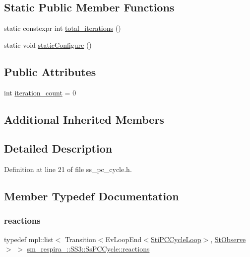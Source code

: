 \subsection*{Static Public Member Functions}
\begin{DoxyCompactItemize}
\item 
static constexpr int \hyperlink{structsm__respira__1_1_1SS3_1_1SsPCCycle_a9d53ab702ea684b8856696cca20f1115}{total\+\_\+iterations} ()
\item 
static void \hyperlink{structsm__respira__1_1_1SS3_1_1SsPCCycle_a94b00884a6ca90ba16b8207ece448ea4}{static\+Configure} ()
\end{DoxyCompactItemize}
\subsection*{Public Attributes}
\begin{DoxyCompactItemize}
\item 
int \hyperlink{structsm__respira__1_1_1SS3_1_1SsPCCycle_ad4242946ceb38c89f6e4c916139a2e93}{iteration\+\_\+count} = 0
\end{DoxyCompactItemize}
\subsection*{Additional Inherited Members}


\subsection{Detailed Description}


Definition at line 21 of file ss\+\_\+pc\+\_\+cycle.\+h.



\subsection{Member Typedef Documentation}
\mbox{\label{structsm__respira__1_1_1SS3_1_1SsPCCycle_a04b24f141aa6ad55e40be05fe81d9c8b}} 
\subsubsection{\texorpdfstring{reactions}{reactions}}
{\footnotesize\ttfamily typedef mpl\+::list$<$ Transition$<$Ev\+Loop\+End$<$\hyperlink{structsm__respira__1_1_1pc__cycle__inner__states_1_1StiPCCycleLoop}{Sti\+P\+C\+Cycle\+Loop}$>$, \hyperlink{structsm__respira__1_1_1StObserve}{St\+Observe}$>$ $>$ \hyperlink{structsm__respira__1_1_1SS3_1_1SsPCCycle_a04b24f141aa6ad55e40be05fe81d9c8b}{sm\+\_\+respira\+\_\+::\+S\+S3\+::\+Ss\+P\+C\+Cycle\+::reactions}}



